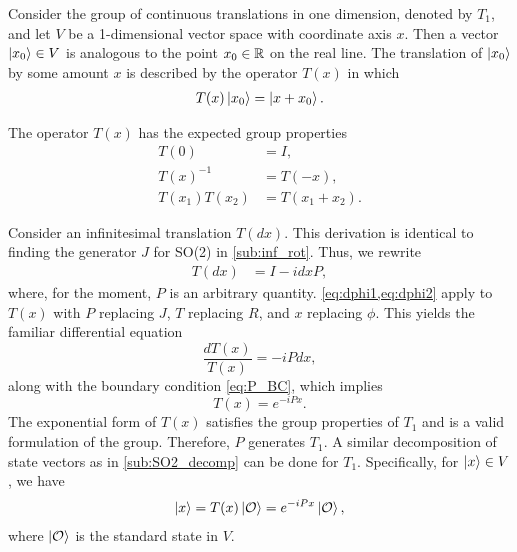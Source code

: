 Consider the group of continuous translations in one dimension, denoted by $T_1$, and let $V$ be a 1-dimensional vector space with coordinate axis $x$. Then a vector $\ket{x_0}\in V$ is analogous to the point $x_0\in\mathbb{R}$ on the real line. The translation of $\ket{x_0}$ by some amount $x$ is described by the operator $T(x)$ in which
\begin{align*}
    T(x)\ket{x_0} = \ket{x+x_0}.
\end{align*}

The operator $T(x)$ has the expected group properties
\begin{align}
    T(0) &= I, \label{eq:P_BC} \\
    T(x)^{-1} &= T(-x), \label{eq:P_inv}\\
    T(x_1)T(x_2) &= T(x_1+x_2).\label{eq:P_add}
\end{align}

Consider an infinitesimal translation $T(dx)$. This derivation is identical to finding the generator $J$ for SO(2) in \cref{sub:inf_rot}. Thus, we rewrite
\begin{align*}
    T(dx) &= I - i dx P,
\end{align*}
where, for the moment, $P$ is an arbitrary quantity. \cref{eq:dphi1,eq:dphi2} apply to $T(x)$ with $P$ replacing $J$, $T$ replacing $R$, and $x$ replacing $\phi$. This yields the familiar differential equation
\begin{equation}
    \frac{dT(x)}{T(x)} = -iP dx,
\end{equation}
along with the boundary condition \cref{eq:P_BC}, which implies
\begin{equation}
    T(x) = e^{-iPx}.
\end{equation}
The exponential form of $T(x)$ satisfies the group properties of $T_1$ and is a valid formulation of the group. Therefore, $P$ generates $T_1$. A similar decomposition of state vectors as in \cref{sub:SO2_decomp} can be done for $T_1$. Specifically, for $\ket{x}\in V$, we have
\begin{align*}
    \ket{x} = T(x)\ket{\mathcal{O}} = e^{-iPx}\ket{\mathcal{O}},
\end{align*}
where $\ket{\mathcal{O}}$ is the standard state in $V$.

